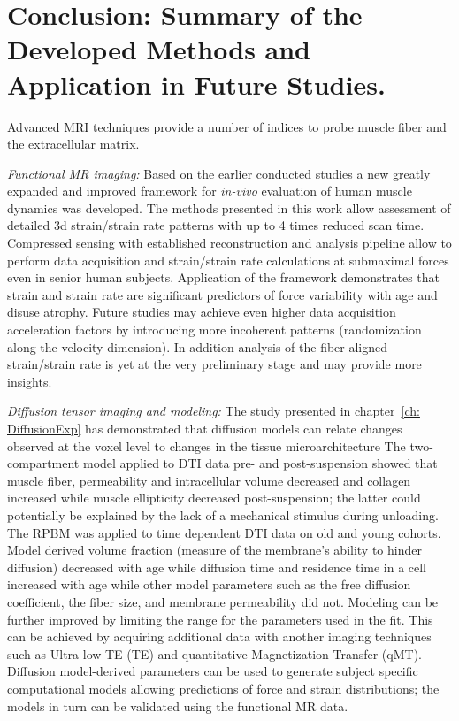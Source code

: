 \chapter{Conclusion: Summary of the Developed Methods and Application in Future Studies.}
Advanced MRI techniques provide a number of indices to probe muscle fiber and the extracellular matrix. 

\textit{Functional MR imaging:} Based on the earlier conducted studies a new greatly expanded and improved framework for \textit{in-vivo} evaluation of human muscle dynamics was developed.
The methods presented in this work allow assessment of detailed 3d strain/strain rate patterns with up to 4 times reduced scan time.
Compressed sensing with established reconstruction and analysis pipeline allow to perform data acquisition and strain/strain rate calculations at submaximal forces even in senior human subjects.
Application of the framework demonstrates that strain and strain rate are significant predictors of force variability with age and disuse atrophy.
Future studies may achieve even higher data acquisition acceleration factors by introducing more incoherent patterns (randomization along the velocity dimension).
In addition analysis of the fiber aligned strain/strain rate is yet at the very preliminary stage and may provide more insights.

\textit{Diffusion tensor imaging and modeling:} The study presented in chapter~\ref{ch: DiffusionExp} has demonstrated that diffusion models can relate changes observed at the voxel level to changes in the tissue microarchitecture
The two-compartment model applied to DTI data pre- and post-suspension showed that muscle fiber, permeability and intracellular volume decreased and collagen increased while muscle ellipticity decreased post-suspension; the latter could potentially be explained by the lack of a mechanical stimulus during unloading. 
The RPBM was applied to time dependent DTI data on old and young cohorts.
Model derived volume fraction (measure of the membrane's ability to hinder diffusion) decreased with age while diffusion time and residence time in a cell increased with age while other model parameters such as the free diffusion coefficient, the fiber size, and membrane permeability did not.
Modeling can be further improved by limiting the range for the parameters used in the fit.
This can be achieved by acquiring additional data with another imaging techniques such as Ultra-low TE (TE) and quantitative Magnetization Transfer (qMT).
Diffusion model-derived parameters can be used to generate subject specific computational models allowing predictions of force and strain distributions; the models in turn can be validated using the functional MR data.


